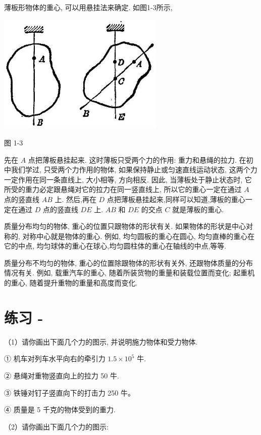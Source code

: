\documentclass[10pt]{article}
\begin{document}
薄板形物体的重心, 可以用悬挂法来确定. 如图1-3所示,

\begin{center}
\includegraphics[max width=0.6\textwidth]{images/01912d55-147c-70aa-b0e0-1782a122f948_19_608135.jpg}
\end{center}

图 1-3

先在 \(A\) 点把薄板悬挂起来. 这时薄板只受两个力的作用: 重力和悬绳的拉力. 在初中我们学过, 只受两个力作用的物体, 如果保持静止或匀速直线运动状态, 这两个力一定作用在同一条直线上, 大小相等, 方向相反. 因此, 当薄板处于静止状态时, 它所受的重力必定跟悬绳对它的拉力在同一竖直线上, 所以它的重心一定在通过 \(A\) 点的竖直线 \({AB}\) 上. 然后,再在 \(D\) 点把薄板悬挂起来,同样可以知道,薄板的重心一定在通过 \(D\) 点的竖直线 \({DE}\) 上. \({AB}\) 和 \({DE}\) 的交点 \(C\) 就是薄板的重心.

质量分布均匀的物体, 重心的位置只跟物体的形状有关. 如果物体的形状是中心对称的, 对称中心就是物体的重心. 例如, 均匀圆板的重心在圆心, 均匀直棒的重心在它的中点, 均匀球体的重心在球心,均匀圆柱体的重心在轴线的中点,等等.

质量分布不均匀的物体, 重心的位置除跟物体的形状有关外, 还跟物体质量的分布情况有关. 例如, 载重汽车的重心, 随着所装货物的重量和装载位置而变化; 起重机的重心, 随着提升重物的重量和高度而变化.

\section*{练习 -}

（1）请你画出下面几个力的图示, 并说明施力物体和受力物体.

① 机车对列车水平向右的牵引力 \({1.5} \times {10}^{5}\) 牛.

② 悬绳对重物竖直向上的拉力 50 牛.

③ 铁锤对钉子竖直向下的打击力 250 牛。

④ 质量是 5 千克的物体受到的重力.

（2）请你画出下面几个力的图示:
\end{document}
